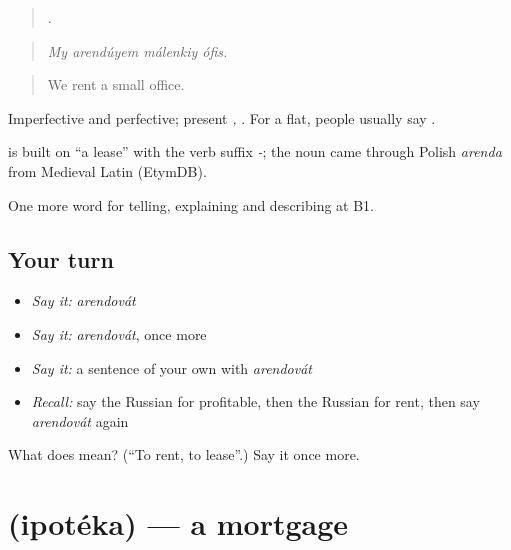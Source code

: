 \begin{quote}
   .
\end{quote}

\begin{quote}
\emph{My arendúyem málenkiy ófis.}
\end{quote}

\begin{quote}
We rent a small office.
\end{quote}

Imperfective and perfective; present \emph{, }. For a flat, people usually say \emph{}.

\begin{cousinweb}
\textbf{} is built on \emph{} \textquotedblleft{}a lease\textquotedblright{} with the verb suffix \emph{-}; the noun came through Polish \emph{arenda} from Medieval Latin (EtymDB).
\end{cousinweb}

\begin{grammarlens}[title={What you've built}]
One more word for telling, explaining and describing at B1.
\end{grammarlens}

\subsection*{Your turn}
\begin{itemize}
\raggedright
  \item \emph{Say it:} \emph{arendovát}
  \item \emph{Say it:} \emph{arendovát}, once more
  \item \emph{Say it:} a sentence of your own with \emph{arendovát}
  \item \emph{Recall:} say the Russian for profitable, then the Russian for rent, then say \emph{arendovát} again
\end{itemize}

\begin{tcolorbox}[breakable,colback=teal!4,colframe=teal!35!black,title={Before you move on}]
What does  mean? (\textquotedblleft{}To rent, to lease\textquotedblright{}.) Say it once more.
\end{tcolorbox}
\section[\texorpdfstring{\ru{ипотека} (ipotéka)}{ипотека (ipotéka)}]{ (ipotéka) — a mortgage}

